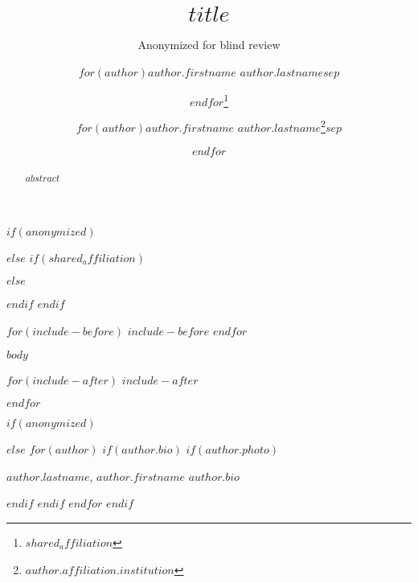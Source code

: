 \documentclass[ngerman, $if(anonymized)$anonymous=true $endif$]{mucproc}
\begin{document}
	
	
\title{$title$}
$if(anonymized)$
\author{Anonymized for blind review}
\email{-}
$else$
$if(shared_affiliation)$
\author{$for(author)$$author.firstname$ $author.lastname$$sep$\and $endfor$\thanks[inst]{$shared_affiliation$}}
$else$
  \author{$for(author)$$author.firstname$ $author.lastname$\thanks[inst]{$author.affiliation.institution$}$sep$\and $endfor$}
$endif$
$endif$

\maketitle
	
\begin{abstract}
$abstract$
\end{abstract}


$for(include-before)$
  $include-before$
$endfor$

$body$

$for(include-after)$
$include-after$

$endfor$



$if(anonymized)$

$else$
  $for(author)$
    $if(author.bio)$
    $if(author.photo)$
    \begin{authoraddendum}{$author.lastname$, $author.firstname$}
	$author.bio$
    \end{authoraddendum}
    $endif$
    $endif$
  $endfor$
$endif$
\end{document}
